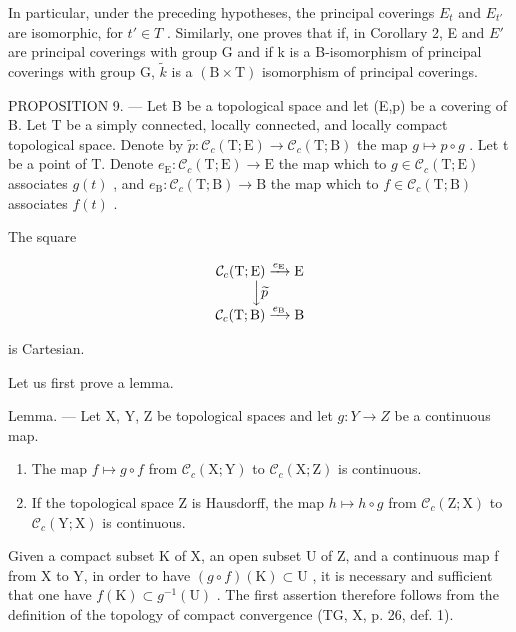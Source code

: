 In particular, under the preceding hypotheses, the principal coverings \(E_{t}\) and \(E_{t'}\) are isomorphic, for \(t' \in T\) . Similarly, one proves that if, in Corollary 2, E and \(E'\) are principal coverings with group G and if k is a B-isomorphism of principal coverings with group G, \(\widetilde{k}\) is a \((\mathrm{B} \times \mathrm{T})\) isomorphism of principal coverings.

PROPOSITION 9. --- Let B be a topological space and let (E,p) be a covering of B. Let T be a simply connected, locally connected, and locally compact topological space. Denote by \(\widetilde{p}\colon\mathcal{C}_{c}(\mathrm{T};\mathrm{E})\to\mathcal{C}_{c}(\mathrm{T};\mathrm{B})\) the map \(g\mapsto p\circ g\) . Let t be a point of T. Denote \(e_{\mathrm{E}}\colon\mathcal{C}_{c}(\mathrm{T};\mathrm{E})\to\mathrm{E}\) the map which to \(g\in\mathcal{C}_{c}(\mathrm{T};\mathrm{E})\) associates \(g(t)\) , and \(e_{\mathrm{B}}\colon\mathcal{C}_{c}(\mathrm{T};\mathrm{B})\to\mathrm{B}\) the map which to \(f\in\mathcal{C}_{c}(\mathrm{T};\mathrm{B})\) associates \(f(t)\) .

The square

\[
\begin{array}{c} \mathcal {C} _ {c} (\mathrm{T}; \mathrm{E}) \xrightarrow {e _ {\mathrm{E}}} \mathrm{E} \\ \Big \downarrow \widetilde {p} \\ \mathcal {C} _ {c} (\mathrm{T}; \mathrm{B}) \xrightarrow {e _ {\mathrm{B}}} \mathrm{B} \end{array}
\]

is Cartesian.

Let us first prove a lemma.

Lemma. --- Let X, Y, Z be topological spaces and let \(g: Y \rightarrow Z\) be a continuous map.

\begin{enumerate}
\def\labelenumi{\alph{enumi})}
\item
  The map \(f\mapsto g\circ f\) from \(\mathcal{C}_c(\mathrm{X};\mathrm{Y})\) to \(\mathcal{C}_c(\mathrm{X};\mathrm{Z})\) is continuous.
\item
  If the topological space Z is Hausdorff, the map \(h \mapsto h \circ g\) from \(\mathcal{C}_{c}(\mathrm{Z};\mathrm{X})\) to \(\mathcal{C}_{c}(\mathrm{Y};\mathrm{X})\) is continuous.
\end{enumerate}

Given a compact subset K of X, an open subset U of Z, and a continuous map f from X to Y, in order to have \((g \circ f)(\mathrm{K}) \subset \mathrm{U}\) , it is necessary and sufficient that one have \(f(\mathrm{K}) \subset g^{-1}(\mathrm{U})\) . The first assertion therefore follows from the definition of the topology of compact convergence (TG, X, p. 26, def. 1).

